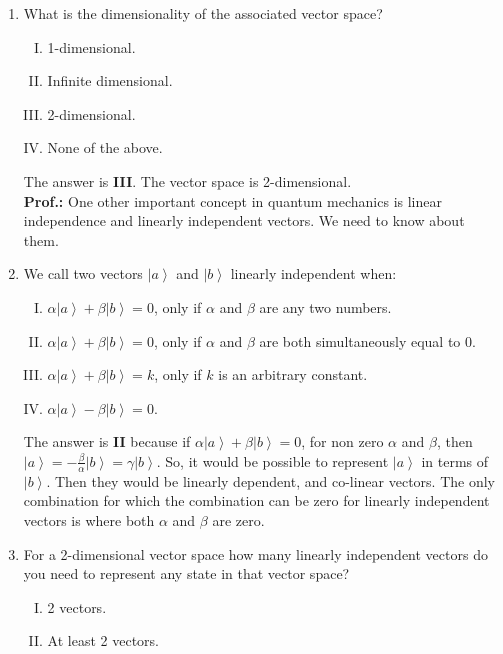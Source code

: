 \documentclass[12pt]{article}
\newcommand\rr{\right \rangle}
\newcommand\ls{\left |}
\newcommand\tbf[1]{\textbf{#1}}
\newcommand\ta{\tbf{Alice: }}
\newcommand\tp{\tbf{Prof.: }}
\newcommand\none{None of the above.}
\begin{document}
\begin{enumerate}[1.]
 \ta Sounds great! \newline
 \tp Tell me, if I have a two state system in quantum mechanics, then,
 	\item What is the dimensionality of the associated vector space?
 	\begin{enumerate}[I.]
 		\item 1-dimensional.
 		\item Infinite dimensional.
 		\item 2-dimensional.
 		\item \none \newline
 	\end{enumerate}
 	The answer is \tbf{III}. The vector space is 2-dimensional. \\ \newline
 \tp One other important concept in quantum mechanics is linear independence and linearly independent vectors. We need to know about them.
 	\item We call two vectors $\ls a \rr$ and $\ls b \rr$ linearly independent when:
 		\begin{enumerate}[I.]
 			\item $\alpha \ls a \rr + \beta \ls b \rr = 0$, only if $\alpha$ and $\beta$ are any two numbers.
 			\item $\alpha \ls a \rr + \beta \ls b \rr = 0$, only if $\alpha$ and $\beta$ are both simultaneously equal to $0$.
 			\item $\alpha \ls a \rr + \beta \ls b \rr = k$, only if $k$ is an arbitrary constant.
 			\item $\alpha \ls a \rr - \beta \ls b \rr = 0$. \\ \newline
 		\end{enumerate}
 	The answer is \tbf{II} because if $\alpha \ls a \rr + \beta \ls b \rr = 0$, for non zero $\alpha$ and $\beta$, then $\ls a \rr = -\frac{\beta}{\alpha}\ls b \rr = \gamma \ls b \rr$. So, it would be possible to represent $\ls a \rr$ in terms of $\ls b \rr$. Then they would be linearly dependent, and co-linear vectors. The only combination for which the combination can be zero for linearly independent vectors is where both $\alpha$ and $\beta$ are zero.
 	\item For a 2-dimensional vector space how many linearly independent vectors do you need to represent any state in that vector space?
 		\begin{enumerate}[I.]
 			\item 2 vectors.
 			\item At least 2 vectors.

\end{enumerate}
\end{enumerate}
\end{document}
